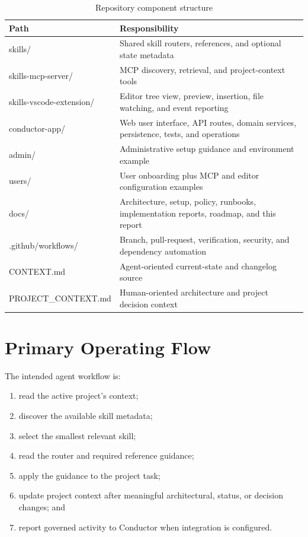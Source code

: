 \documentclass[12pt]{report}
\begin{document}
\begin{table}[hbt!]
\centering
\small
\begin{tabularx}{\textwidth}{>{\ttfamily}p{}X}
\toprule
Path & Responsibility \\
\midrule
skills/ & Shared skill routers, references, and optional state metadata \\
skills-mcp-server/ & MCP discovery, retrieval, and project-context tools \\
skills-vscode-extension/ & Editor tree view, preview, insertion, file watching, and event reporting \\
conductor-app/ & Web user interface, API routes, domain services, persistence, tests, and operations \\
admin/ & Administrative setup guidance and environment example \\
users/ & User onboarding plus MCP and editor configuration examples \\
docs/ & Architecture, setup, policy, runbooks, implementation reports, roadmap, and this report \\
.github/workflows/ & Branch, pull-request, verification, security, and dependency automation \\
CONTEXT.md & Agent-oriented current-state and changelog source \\
PROJECT\_CONTEXT.md & Human-oriented architecture and project decision context \\
\bottomrule
\end{tabularx}
\caption{Repository component structure}
\label{tab:repo-structure}
\end{table}

\section{Primary Operating Flow}

The intended agent workflow is:

\begin{enumerate}
  \item read the active project's context;
  \item discover the available skill metadata;
  \item select the smallest relevant skill;
  \item read the router and required reference guidance;
  \item apply the guidance to the project task;
  \item update project context after meaningful architectural, status, or decision changes; and
  \item report governed activity to Conductor when integration is configured.
\end{enumerate}
\end{document}
